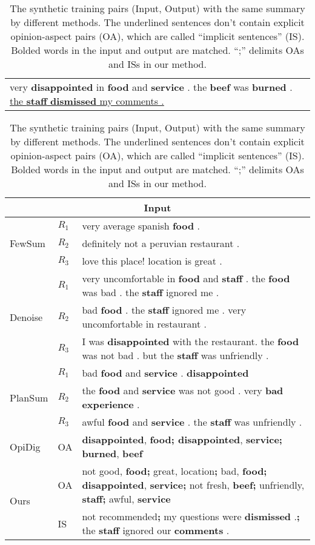 \begin{table}[th]
	\centering
	\scriptsize
	\begin{tabular}{|p{7.8cm}|}
		\hline \rule{0pt}{10pt}
		\makecell[c]{\bf Output (Sampled Summary)} \\
		\hline
		very \textbf{disappointed} in \textbf{food} and \textbf{service} . the \textbf{beef} was \textbf{burned} . 
		\underline{the \textbf{staff} \textbf{dismissed} my comments .} 
		\vspace{0.2em}\\
		\hline
	\end{tabular}
	\begin{tabular}{|m{0.8cm}|m{0.3cm}<{\centering}|m{5.8cm}|}
		\hline
		\multicolumn{3}{|c|}{\rule{0pt}{10pt} \bf Input}  \\	
		\hline
		\multirow{3}{0.1cm}{FewSum} & $R_1$ & very average spanish \textbf{food} .
		\\
		\cline{2-3}
		& $R_2$ &definitely not a peruvian restaurant
		.
		\\
		\cline{2-3}
		& $R_3$ &love this place! location is great
		.
		\\
		\hline
		\multirow{3}{0.1cm}{Denoise} & $R_1$ & very uncomfortable in \textbf{food} and \textbf{staff} . the \textbf{ food} was bad . the \textbf{staff} ignored me .
		\\
		\cline{2-3}
		& $R_2$ & bad \textbf{food} . the \textbf{staff} ignored me . very uncomfortable in restaurant .\\
		\cline{2-3}
		& $R_3$ &I was \textbf{disappointed} with the restaurant. the \textbf{food} was not bad . but the \textbf{staff} was unfriendly .
		\\
		\hline
		\multirow{3}{0.1cm}{PlanSum} & $R_1$ & bad \textbf{food} and \textbf{service} . \textbf{disappointed} \\
		\cline{2-3}
		& $R_2$& the \textbf{food} and \textbf{service} was not good . very \textbf{bad experience} .
		\\
		\cline{2-3}
		& $R_3$ &awful \textbf{food} and \textbf{service} . the \textbf{staff} was unfriendly .
		\\
		\hline
		OpiDig & OA & \textbf{disappointed}, \textbf{food; disappointed}, \textbf{service; burned}, \textbf{beef}
		\\
		\hline
		\multirow{2}{0.1cm}{Ours} & OA &not good, \textbf{food;} great, location\textbf{;} bad, \textbf{food; disappointed}, \textbf{service;} not fresh, \textbf{beef;} unfriendly, \textbf{staff;} awful, \textbf{service}\\
		\cline{2-3}
		& IS &not recommended\textbf{;} my questions were \textbf{dismissed} .\textbf{;} the \textbf{staff} ignored our \textbf{comments} .\\
		\hline
	\end{tabular}
	\caption{The synthetic training pairs (Input, Output) with the same summary 
		by different methods. The underlined sentences don't contain explicit opinion-aspect pairs (OA), 
		which are called ``implicit sentences'' (IS).  
		Bolded words in the input and output are matched.
		``;'' delimits OAs and ISs in our method.
	}\label{tab:previous_data}  
\end{table}
